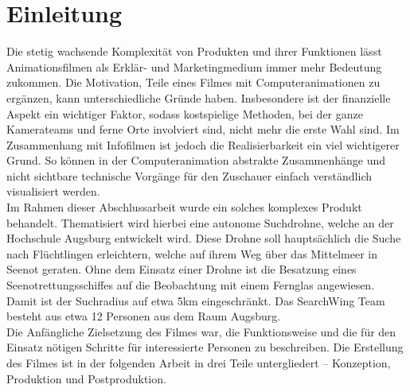 
\chapter{Einleitung}

Die stetig wachsende Komplexität von Produkten und ihrer Funktionen lässt Animationsfilmen als Erklär- und Marketingmedium immer mehr Bedeutung zukommen. Die Motivation, Teile eines Filmes mit Computeranimationen zu ergänzen, kann unterschiedliche Gründe haben. 
Insbesondere ist der finanzielle Aspekt ein wichtiger Faktor, sodass kostspielige Methoden, bei der ganze Kamerateams und ferne Orte involviert sind, nicht mehr die erste Wahl sind.
Im Zusammenhang mit Infofilmen ist jedoch die Realisierbarkeit ein viel wichtigerer Grund. So können in der Computeranimation abstrakte Zusammenhänge und nicht sichtbare technische Vorgänge für den Zuschauer einfach verständlich visualisiert werden.\\
Im Rahmen dieser Abschlussarbeit wurde ein solches komplexes Produkt behandelt. Thematisiert wird hierbei eine autonome Suchdrohne, welche an der Hochschule Augsburg entwickelt wird. Diese Drohne soll hauptsächlich die Suche nach Flüchtlingen erleichtern, welche auf ihrem Weg über das Mittelmeer in Seenot geraten. Ohne dem Einsatz einer Drohne ist die Besatzung eines Seenotrettungsschiffes auf die Beobachtung mit einem Fernglas angewiesen. Damit ist der Suchradius auf etwa 5km eingeschränkt. Das SearchWing Team besteht aus etwa 12 Personen aus dem Raum Augsburg. \\
Die Anfängliche Zielsetzung des Filmes war, die Funktionsweise und die für den Einsatz nötigen Schritte für interessierte Personen zu beschreiben.
Die Erstellung des Filmes ist in der folgenden Arbeit in drei Teile untergliedert -- Konzeption, Produktion und Postproduktion.